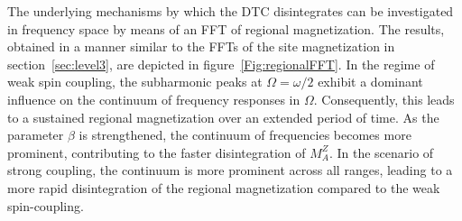 \documentclass[12pt]{iopart}
\begin{document}
The underlying mechanisms by which the DTC disintegrates can be investigated in frequency space by means of an FFT of regional magnetization. The results, obtained in a manner similar to the FFTs of the site magnetization in section~\ref{sec:level3}, are depicted in figure~\ref{Fig:regionalFFT}. In the regime of weak spin coupling, the subharmonic peaks at $\Omega=\omega/2$ exhibit a dominant influence on the continuum of frequency responses in $\Omega$. Consequently, this leads to a sustained regional magnetization over an extended period of time. As the parameter $\beta$ is strengthened,  the continuum of frequencies becomes more prominent, contributing to the faster disintegration of $M^Z_A$. In the scenario of strong coupling, the continuum is more prominent across all ranges, leading to a more rapid disintegration of the regional magnetization compared to the weak spin-coupling.

	
	
\end{document}
